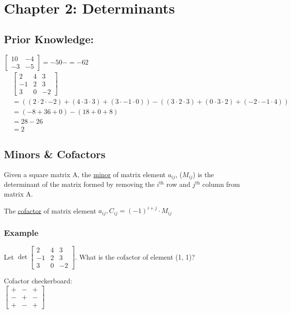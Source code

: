 \documentclass[
  letterpaper,
  DIV=11,
  numbers=noendperiod]{scrartcl}
\begin{document}
\section{Chapter 2: Determinants}\label{chapter-2-determinants}

\subsection{Prior Knowledge:}\label{prior-knowledge}

\(\begin{bmatrix}10 & -4 \\ -3 & -5 \end{bmatrix}=-50-=-62\)
\begin{align*}
&\begin{bmatrix}2 & 4 & 3 \\ -1 & 2 & 3 \\ 3 & 0 & -2 \end{bmatrix} \\
&= ((2\cdot2\cdot-2) + (4\cdot3\cdot3)+(3\cdot-1\cdot0))-((3\cdot2\cdot3)+(0\cdot3\cdot2)+(-2\cdot-1\cdot4)) \\
&= (-8+36+0)-(18+0+8) \\
&= 28-26 \\
&= 2
\end{align*}

\subsection{Minors \& Cofactors}\label{minors-cofactors}

Given a square matrix A, the \ul{minor} of matrix element \(a_{ij}\),
(\(M_{ij}\)) is the determinant of the matrix formed by removing the
\(i^{\text{th}}\) row and \(j^{\text{th}}\) column from matrix A.

The \ul{cofactor} of matrix element
\(a_{ij}, C_{ij}=(-1)^{i+j}\cdot M_{ij}\)

\subsubsection{Example}\label{example}

Let \(\det\begin{bmatrix}2&4&3 \\ -1&2&3 \\ 3&0&-2\end{bmatrix}\). What
is the cofactor of element (1, 1)?

Cofactor checkerboard:\\
\(\begin{bmatrix}+ & - & + \\ - & + & - \\ + & - & +\end{bmatrix}\)
\end{document}

